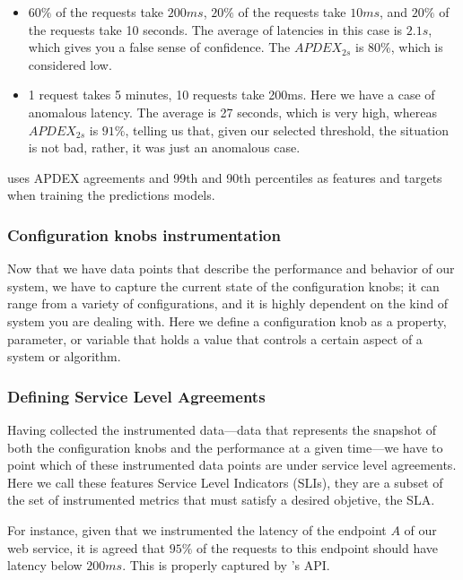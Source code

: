 \begin{itemize}
  \item $60\%$ of the requests take $200ms$, $20\%$ of the requests take $10ms$, and $20\%$ of the requests take 10 seconds. The average of latencies in this case is $2.1s$, which gives you a false sense of confidence. The $APDEX_{2s}$ is $80\%$, which is considered low.
  \item 1 request takes 5 minutes, 10 requests take 200ms. Here we have a case of anomalous latency. The average is 27 seconds, which is very high, whereas $APDEX_{2s}$ is $91\%$, telling us that, given our selected threshold, the situation is not bad, rather, it was just an anomalous case.
  
\end{itemize}

\projectname{} uses APDEX agreements and 99th and 90th percentiles as features and targets when training the predictions models.


\subsubsection{Configuration knobs instrumentation}

Now that we have data points that describe the performance and behavior of our system, we have to capture the current state of the configuration knobs; it can range from a variety of configurations, and it is highly dependent on the kind of system you are dealing with. Here we define a configuration knob as a property, parameter, or variable that holds a value that controls a certain aspect of a system or algorithm.

\subsubsection{Defining Service Level Agreements}

Having collected the instrumented data---data that represents the snapshot of both the configuration knobs and the performance at a given time---we have to point which of these instrumented data points are under service level agreements. Here we call these features Service Level Indicators (SLIs), they are a subset of the set of instrumented metrics that must satisfy a desired objetive, the SLA. 

For instance, given that we instrumented the latency of the endpoint $A$ of our web service, it is agreed that $95\%$ of the requests to this endpoint should have latency below $200ms$. This is properly captured by \projectname{}'s API.

